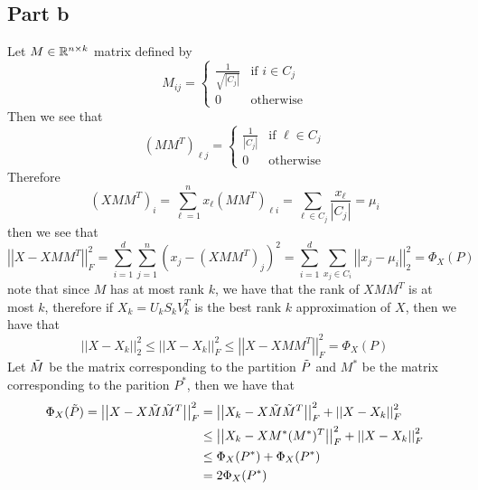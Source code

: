 \documentclass[12pt]{report}
\newcommand{\norm}[1]{\left|\left|#1\right|\right|}
\begin{document}
\subsection*{Part b}
Let $M \in \mathbb{R}^{n \times k}$ matrix defined by
\begin{equation*}
  M_{ij} = \begin{cases}
    \frac{1}{\sqrt{|C_j|}} & \text{if } i \in C_j \\
    0 & \text{otherwise}
  \end{cases}
\end{equation*}
Then we see that
\begin{equation*}
  (MM^T)_{\ell j} = \begin{cases}
    \frac{1}{|C_j|} & \text{if } \ell \in C_j \\
    0 & \text{otherwise}
  \end{cases}
\end{equation*}
Therefore
\begin{equation*}
  (XMM^T)_i = \sum_{\ell = 1}^n x_{\ell} (MM^T)_{\ell i} = \sum_{\ell \in C_j} \frac{x_{\ell}}{|C_j|} = \mu_i
\end{equation*}
then we see that
\begin{equation*}
  \norm{X - XMM^T}^2_F = \sum_{i=1}^d \sum_{j=1}^n (x_j - (XMM^T)_j)^2 = \sum_{i=1}^d \sum_{x_j \in C_i} \norm{x_j - \mu_i}_2^2 = \Phi_X(P)
\end{equation*}
note that since $M$ has at most rank $k$, we have that the rank of $XMM^T$ is at most $k$, therefore if $X_k = U_k S_k V_k^T$ is the best rank $k$ approximation of $X$, then we have that
\begin{equation*}
  \norm{X-X_k}_2^2 \leq \norm{X-X_k}_F^2 \leq \norm{X-XMM^T}_F^2 = \Phi_X(P)
\end{equation*}
Let $\Tilde{M}$ be the matrix corresponding to the partition $\Tilde{P}$ and $M^*$ be the matrix corresponding to the parition $P^*$, then we have that
\begin{align*}
  \Phi_{X}(\Tilde{P}) = \norm{X - X\Tilde{M}\Tilde{M}^T}_F^2 &= \norm{X_k - X\Tilde{M}\Tilde{M}^T}_F^2 + \norm{X - X_k}_F^2 \\
                                       &\leq \norm{X_k - X M^*(M^*)^T}_F^2 + \norm{X - X_k}_F^2 \\
                                       &\leq \Phi_X(P^*) + \Phi_X(P^*) \\
                                       &= 2\Phi_X(P^*)
\end{align*}
\end{document}
